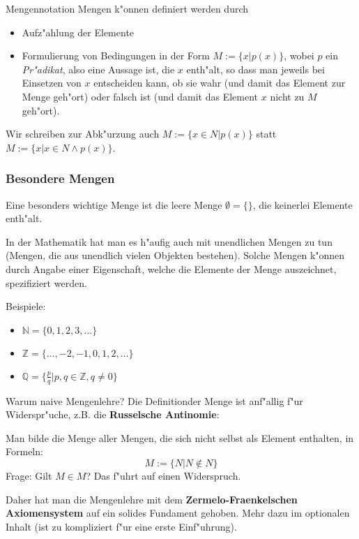\documentclass{beamer}
\begin{document}
\begin{frame}{Mengennotation}
Mengen k"onnen definiert werden durch
\begin{itemize}
  \item Aufz"ahlung der Elemente
  \item Formulierung von Bedingungen in der Form $M:=\{x|p(x)\}$, wobei $p$ ein \textit{Pr"adikat}, also eine Aussage ist, die $x$ enth"alt, so dass man jeweils bei Einsetzen von $x$ entscheiden kann, ob sie wahr (und damit das Element zur Menge geh"ort) oder falsch ist (und damit das Element $x$ nicht zu $M$ geh"ort).
\end{itemize}
  Wir schreiben zur Abk"urzung auch $M:=\{x\in N|p(x)\}$ statt $M:=\{x|x\in N\wedge p(x)\}$.
\end{frame}
\begin{frame}
  \frametitle{Besondere Mengen}
  Eine besonders wichtige Menge ist die leere Menge $\emptyset = \{\}$, die keinerlei
Elemente enth"alt.

In der Mathematik hat man es h"aufig auch mit unendlichen Mengen zu
tun (Mengen, die aus unendlich vielen Objekten bestehen).
Solche Mengen k"onnen durch Angabe einer Eigenschaft, welche die
Elemente der Menge auszeichnet, spezifiziert werden.

Beispiele:
\begin{itemize}
  \item $\mathbb{N}=\{0,1,2,3,\dots\}$
  \item $\mathbb{Z}=\{\dots,-2,-1,0,1,2,\dots\}$
  \item $\mathbb{Q}=\{\frac{p}{q}|p,q\in\mathbb{Z}, q\neq 0\}$
  
\end{itemize}
\end{frame}

\begin{frame}{Warum naive Mengenlehre?}
  Die \glqq Definition\grqq der Menge ist anf"allig f"ur Widerspr"uche, z.B. die \textbf{Russelsche Antinomie}:

  Man bilde die Menge aller Mengen, die sich nicht selbst als Element enthalten, in Formeln:
  \[M:=\{N|N\notin N\}\]
  Frage: Gilt $M\in M$? Das f"uhrt auf einen Widerspruch.
  
  Daher hat man die Mengenlehre mit dem \textbf{Zermelo-Fraenkelschen Axiomensystem} auf ein solides Fundament gehoben. Mehr dazu im optionalen Inhalt (ist zu kompliziert f"ur eine erste Einf"uhrung).
\end{frame}
\end{document}
